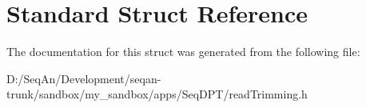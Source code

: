 \hypertarget{struct_standard}{\section{Standard Struct Reference}
\label{struct_standard}
}


The documentation for this struct was generated from the following file\-:\begin{DoxyCompactItemize}
\item 
D\-:/\-Seq\-An/\-Development/seqan-\/trunk/sandbox/my\-\_\-sandbox/apps/\-Seq\-D\-P\-T/read\-Trimming.\-h\end{DoxyCompactItemize}
